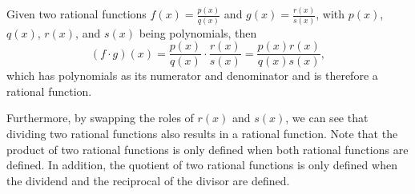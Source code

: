 \documentclass{ximera}
\begin{document}
Given two rational functions $f(x) = \frac{p(x)}{q(x)}$ and $g(x) = \frac{r(x)}{s(x)}$, with $p(x)$, $q(x)$, $r(x)$, and $s(x)$ being polynomials, then 
$$
(f \cdot g)(x) = \frac{p(x)}{q(x)} \cdot \frac{r(x)}{s(x)} =  \frac{p(x)r(x)}{q(x)s(x)}, 
$$
which has polynomials as its numerator and denominator and is therefore a rational function. 

Furthermore, by swapping the roles of $r(x)$ and $s(x)$, we can see that dividing two rational functions also results in a rational function. Note that the product of two rational functions is only defined when both rational functions are defined. In addition, the quotient of two rational functions is only defined when the dividend and the reciprocal of the divisor are defined. 
%
%
%
%
%
%
\end{document}
